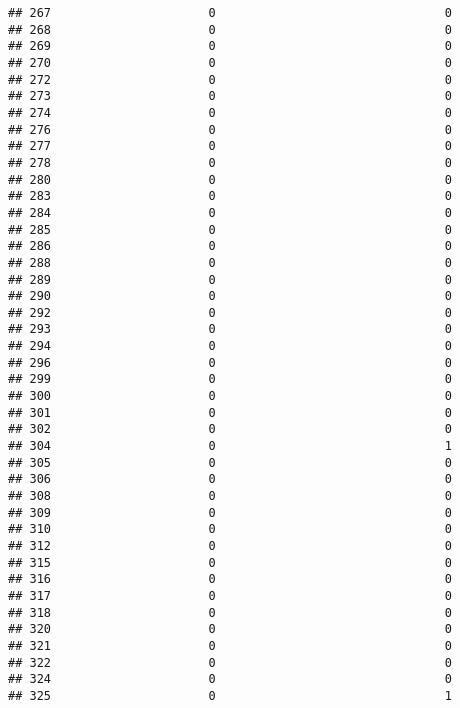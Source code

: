 \documentclass[
]{article}
\begin{document}
\begin{verbatim}
## 267                      0                                0
## 268                      0                                0
## 269                      0                                0
## 270                      0                                0
## 272                      0                                0
## 273                      0                                0
## 274                      0                                0
## 276                      0                                0
## 277                      0                                0
## 278                      0                                0
## 280                      0                                0
## 283                      0                                0
## 284                      0                                0
## 285                      0                                0
## 286                      0                                0
## 288                      0                                0
## 289                      0                                0
## 290                      0                                0
## 292                      0                                0
## 293                      0                                0
## 294                      0                                0
## 296                      0                                0
## 299                      0                                0
## 300                      0                                0
## 301                      0                                0
## 302                      0                                0
## 304                      0                                1
## 305                      0                                0
## 306                      0                                0
## 308                      0                                0
## 309                      0                                0
## 310                      0                                0
## 312                      0                                0
## 315                      0                                0
## 316                      0                                0
## 317                      0                                0
## 318                      0                                0
## 320                      0                                0
## 321                      0                                0
## 322                      0                                0
## 324                      0                                0
## 325                      0                                1

\end{verbatim}
\end{document}
